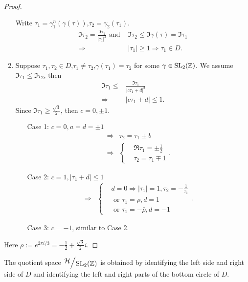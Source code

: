 \begin{proof}
\begin{enumerate}
      Write $\tau_1=\gamma_1^{n}(\gamma(\tau))$,$\tau_2=\gamma_2(\tau_1)$.
      \begin{align*}
	\Im\tau_2=\frac{\Im\tau_1}{|\tau_1|^2} \text{ and }&\Im\tau_2\le \Im\gamma(\tau)= \Im\tau_1\\
	\Rightarrow & |\tau_1|\ge 1\Rightarrow \tau_1\in D
      .\end{align*}
    \item Suppose $\tau_1,\tau_2 \in D$,$\tau_1\neq\tau_2$,$\gamma(\tau_1)=\tau_2$ for some $\gamma\in \operatorname{SL}_2(\mathbb{Z})$. We assume $\Im\tau_1\le \Im\tau_2$, then
      \begin{align*}
	\Im\tau_1\le & \frac{\Im \tau_1}{|c\tau_1+d|^2}\\
	\Rightarrow &|c\tau_1+d|\le 1
      .\end{align*}
      Since $\Im\tau_1\ge \frac{\sqrt{3} }{2}$, then $c=0,\pm 1$. 
      \begin{itemize}
	\item  [Case 1:] $c=0,a=d=\pm 1$
	  \begin{align*}
	    \Rightarrow & \tau_2=\tau_1\pm b\\
	    \Rightarrow &\left\{ 
	    \begin{aligned}
	      &\Re \tau_1=\pm \frac{1}{2}\\
	      &\tau_2=\tau_1\mp 1
	    \end{aligned}\right.
	  .\end{align*}
	\item [Case 2:] $c=1,|\tau_1+d|\le 1$
\begin{align*}
  \Rightarrow & \left\{
    \begin{aligned}
      & d=0\Rightarrow |\tau_1|=1,\tau_2=-\frac{1}{\tau_1}\\
      &  \text{ or } \tau_1=\rho, d=1\\
      & \text{ or } \tau_1=-\overline{\rho},d=-1
    \end{aligned}\right.
.\end{align*}
	\item [Case 3:] $c=-1$, similar to Case 2. 
      \end{itemize}
  \end{enumerate}
  Here $\rho := e^{2\pi i/3}=-\frac{1}{2}+\frac{\sqrt{3} }{2}i$.
\end{proof}

The quotient space $\sfrac{\mathcal{H}}{\SL}$ is obtained by identifying the left side and right side of $D$ and identifying the left and right parts of the bottom circle of $D$.

